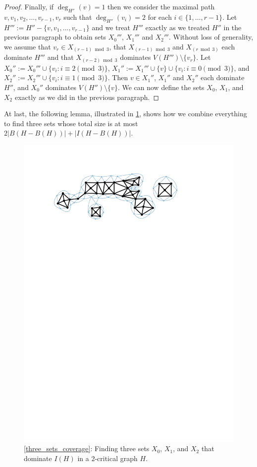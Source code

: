 \documentclass{article}
\newcommand{\pat}[1]{\textcolor{red}{PM: #1}}
\theoremstyle{definition}
\begin{document}
\begin{proof}
  Finally, if $\deg_{H''}(v)=1$ then we consider the maximal path $v,v_1,v_2,\ldots,v_{r-1},v_r$ such that $\deg_{H''}(v_i)=2$ for each $i\in\{1,\ldots,r-1\}$.  Let $H''':=H''-\{v,v_1,\ldots,v_{r-1}\}$ and we treat $H'''$ exactly as we treated $H''$ in the previous paragraph to obtain sets $X_0'''$, $X_1'''$ and $X_2'''$.  Without loss of generality, we assume that $v_r\in X_{(r-1)\bmod 3}$, that $X_{(r-1)\bmod 3}$ and $X_{(r\bmod 3)}$ each dominate $H'''$ and that $X_{(r-2)\bmod 3}$ dominates  $V(H''')\setminus\{v_r\}$. Let $X_0'':=X_0'''\cup\{v_i:i\equiv 2\pmod 3\}$, $X_1'':=X_1'''\cup\{v\}\cup\{v_i:i\equiv 0\pmod 3\}$, and  $X_2'':=X_2'''\cup\{v_i:i\equiv 1\pmod 3\}$.  Then $v\in X_1''$, $X_1''$ and $X_2''$ each dominate $H''$, and $X_0''$ dominates $V(H'')\setminus\{v\}$.  We can now define the sets $X_0$, $X_1$, and $X_2$ exactly as we did in the previous paragraph.
\end{proof}


At last, the following lemma, illustrated in \cref{two_critical_colouring}, shows how we combine everything to find three sets whose total size is at most $2|B(H-B(H))| + |I(H-B(H))|$.

\begin{figure}
  \centering
  \includegraphics[page=4]{figs/two_critical}
  \caption{\cref{three_sets_coverage}: Finding three sets $X_0$, $X_1$, and $X_2$ that dominate $I(H)$ in a $2$-critical graph $H$.}
  \label{two_critical_colouring}
\end{figure}
\end{document}
